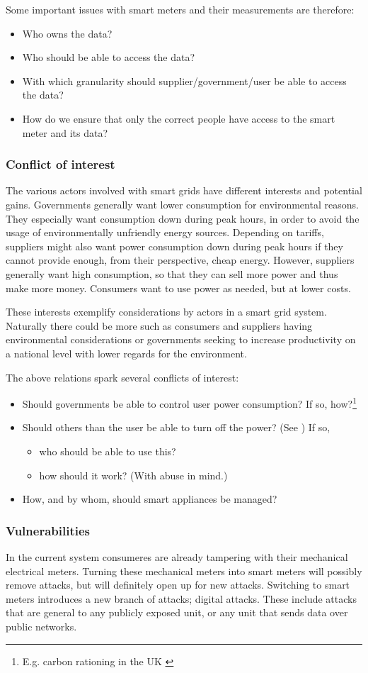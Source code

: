 Some important issues with smart meters and their measurements are therefore:
\begin{itemize}
	\item Who owns the data?
	\item Who should be able to access the data?
	\item With which granularity should supplier/government/user be able to access the data?
	\item How do we ensure that only the correct people have access to the smart meter and its data?
\end{itemize}

\subsubsection{Conflict of interest}
The various actors involved with smart grids have different interests and potential gains.
Governments generally want lower consumption for environmental reasons.
They especially want consumption down during peak hours, in order to avoid the usage of environmentally unfriendly energy sources.
Depending on tariffs, suppliers might also want power consumption down during peak hours if they cannot provide enough, from their perspective, cheap energy.
However, suppliers generally want high consumption, so that they can sell more power and thus make more money.
Consumers want to use power as needed, but at lower costs.

These interests exemplify considerations by actors in a smart grid system.
Naturally there could be more such as consumers and suppliers having environmental considerations or governments seeking to increase productivity on a national level with lower regards for the environment.

The above relations spark several conflicts of interest:
\begin{itemize}
	\item Should governments be able to control user power consumption? If so, how?\footnote{E.g. carbon rationing in the UK \cite{security_economics}}
	\item Should others than the user be able to turn off the power? (See \cite{offswitch}) If so,
	\begin{itemize}
		\item who should be able to use this?
		\item how should it work? (With abuse in mind.)
	\end{itemize}
	\item How, and by whom, should smart appliances be managed?
\end{itemize}

\subsubsection{Vulnerabilities}
In the current system consumeres are already tampering  with their mechanical electrical meters.
Turning these mechanical meters into smart meters will possibly remove attacks, but will definitely open up for new attacks.
Switching to smart meters introduces a new branch of attacks; digital attacks.
These include attacks that are general to any publicly exposed unit, or any unit that sends data over public networks.
